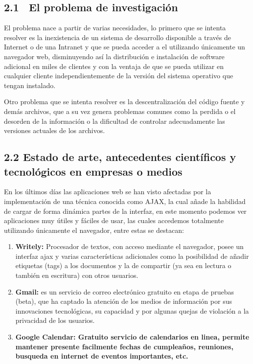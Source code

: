 \documentclass[12pt,letterpaper,oneside]{article}
\begin{document}
\bigskip

\subsection[2.1 \ El problema de investigación]{2.1 \ El problema de
investigación}

\bigskip

{\mdseries\upshape
El problema nace a partir de varias necesidades, lo primero que se
intenta resolver es la inexistencia de un sistema de desarrollo
disponible a través de Internet o de una Intranet y que se pueda
acceder a el utilizando únicamente un navegador web, disminuyendo
así la distribución e instalación de software adicional en miles
de clientes y con la ventaja de que se pueda utilizar en cualquier
cliente independientemente de la versión del sistema operativo que
tengan instalado.}


\bigskip

Otro problema que se intenta resolver es la descentralización del
código fuente y demás archivos, que a su vez genera problemas
comunes como la perdida o el desorden de la información o la
dificultad de controlar adecuadamente las versiones actuales de los
archivos.


\bigskip

\subsection{2.2 Estado de arte, antecedentes científicos y
tecnológicos en empresas o medios}

\bigskip

En los últimos días las aplicaciones web se han visto afectadas por
la implementación de una técnica conocida como AJAX, la cual
añade la habilidad de cargar de forma dinámica partes de la
interfaz, en este momento podemos ver aplicaciones muy útiles y
fáciles de usar, las cuales accedemos totalmente utilizando
únicamente el navegador, entre estas se destacan:


\bigskip


\begin{enumerate}
\item {
\textbf{Writely:} Procesador de textos, con acceso mediante el
navegador, posee un interfaz ajax y varias características
adicionales como la posibilidad de añadir etiquetas (tags) a los
documentos y la de compartir (ya sea en lectura o también en
escritura) con otros usuarios.}


\bigskip
\item \textbf{Gmail:} es un servicio de correo electrónico gratuito en
etapa de pruebas (beta), que ha captado la atención de los medios de
información por sus innovaciones tecnológicas, su capacidad y por
algunas quejas de violación a la privacidad de los usuarios.


\bigskip
\item \textbf{Google Calendar: Gratuito servicio de calendarios en linea,
permite mantener presente facilmente fechas de cumpleaños, reuniones,
busqueda en internet de eventos importantes, etc.}


\bigskip
\end{enumerate}
\end{document}
